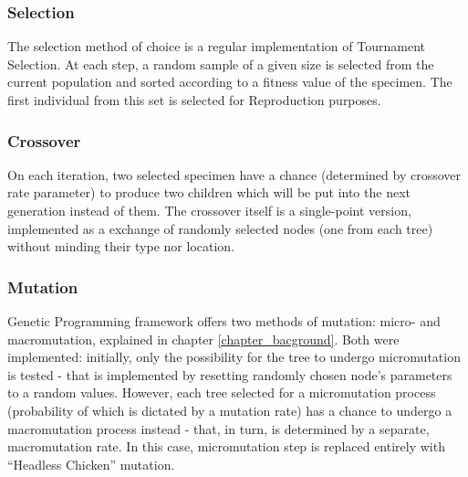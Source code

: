 \subsubsection{Selection}
The selection method of choice is a regular implementation of Tournament Selection. At each step, a random sample of a given size is selected from the current population and sorted according to a fitness value of the specimen. The first individual from this set is selected for Reproduction purposes.
\subsubsection{Crossover}
On each iteration, two selected specimen have a chance (determined by crossover rate parameter) to produce two children which will be put into the next generation instead of them. The crossover itself is a single-point version, implemented as a exchange of randomly selected nodes (one from each tree) without minding their type nor location.
\subsubsection{Mutation}
Genetic Programming framework offers two methods of mutation: micro- and macromutation, explained in chapter \ref{chapter_bacground}. Both were implemented: initially, only the possibility for the tree to undergo micromutation is tested - that is implemented by resetting randomly chosen node's parameters to a random values. However, each tree selected for a micromutation process (probability of which is dictated by a mutation rate) has a chance to undergo a macromutation process instead - that, in turn, is determined by a separate, macromutation rate. In this case, micromutation step is replaced entirely with ``Headless Chicken'' mutation.
